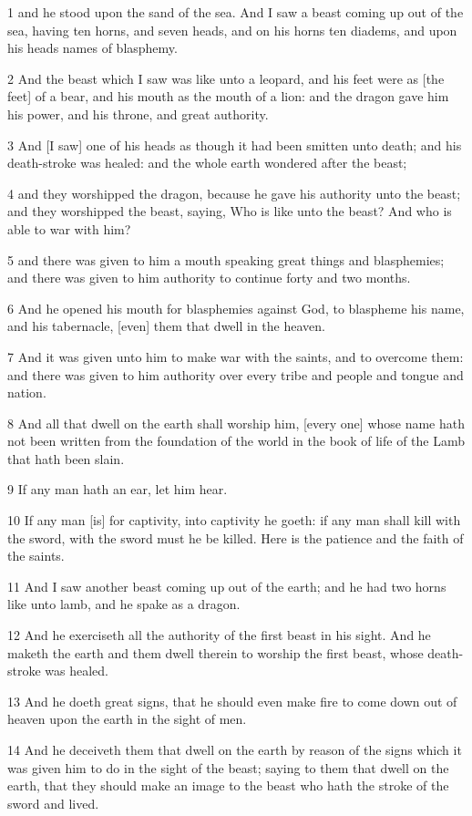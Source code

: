 \par 1 and he stood upon the sand of the sea. And I saw a beast coming up out of the sea, having ten horns, and seven heads, and on his horns ten diadems, and upon his heads names of blasphemy.
\par 2 And the beast which I saw was like unto a leopard, and his feet were as [the feet] of a bear, and his mouth as the mouth of a lion: and the dragon gave him his power, and his throne, and great authority.
\par 3 And [I saw] one of his heads as though it had been smitten unto death; and his death-stroke was healed: and the whole earth wondered after the beast;
\par 4 and they worshipped the dragon, because he gave his authority unto the beast; and they worshipped the beast, saying, Who is like unto the beast? And who is able to war with him?
\par 5 and there was given to him a mouth speaking great things and blasphemies; and there was given to him authority to continue forty and two months.
\par 6 And he opened his mouth for blasphemies against God, to blaspheme his name, and his tabernacle, [even] them that dwell in the heaven.
\par 7 And it was given unto him to make war with the saints, and to overcome them: and there was given to him authority over every tribe and people and tongue and nation.
\par 8 And all that dwell on the earth shall worship him, [every one] whose name hath not been written from the foundation of the world in the book of life of the Lamb that hath been slain.
\par 9 If any man hath an ear, let him hear.
\par 10 If any man [is] for captivity, into captivity he goeth: if any man shall kill with the sword, with the sword must he be killed. Here is the patience and the faith of the saints.
\par 11 And I saw another beast coming up out of the earth; and he had two horns like unto lamb, and he spake as a dragon.
\par 12 And he exerciseth all the authority of the first beast in his sight. And he maketh the earth and them dwell therein to worship the first beast, whose death-stroke was healed.
\par 13 And he doeth great signs, that he should even make fire to come down out of heaven upon the earth in the sight of men.
\par 14 And he deceiveth them that dwell on the earth by reason of the signs which it was given him to do in the sight of the beast; saying to them that dwell on the earth, that they should make an image to the beast who hath the stroke of the sword and lived.
